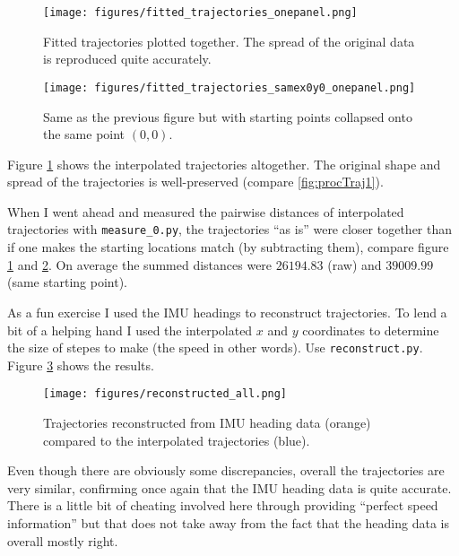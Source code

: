 \documentclass[a4]{article}
\begin{document}
\begin{figure}\begin{center}
  \texttt{[image: figures/fitted\_trajectories\_onepanel.png]}
  \caption{\label{fig:fittedTraj1} Fitted trajectories plotted
    together. The spread of the original data is reproduced quite
    accurately.
    }
\end{center}\end{figure}

\begin{figure}\begin{center}
  \texttt{[image: figures/fitted\_trajectories\_samex0y0\_onepanel.png]}
  \caption{\label{fig:fittedTraj2} Same as the previous figure but with
    starting points collapsed onto the same point $(0,0)$.
    }
\end{center}\end{figure}

Figure \ref{fig:fittedTraj1} shows the interpolated trajectories
altogether. The original shape and spread of the trajectories is
well-preserved (compare \ref{fig:procTraj1}).


When I went ahead and measured the pairwise distances of interpolated
trajectories with \verb+measure_0.py+, the trajectories ``as is'' were
closer together than if one makes the starting locations match (by
subtracting them), compare figure \ref{fig:fittedTraj1} and \ref{fig:fittedTraj2}. On average the summed distances were $26194.83$ (raw)
and $39009.99$ (same starting point).

As a fun exercise I used the IMU headings to reconstruct
trajectories. To lend a bit of a helping hand I used the interpolated
$x$ and $y$ coordinates to determine the size of stepes to make (the
speed in other words). Use \verb+reconstruct.py+. Figure \ref{fig:reconstruct} shows the results.

\begin{figure}\begin{center}
  \texttt{[image: figures/reconstructed\_all.png]}
  \caption{\label{fig:reconstruct} Trajectories reconstructed from IMU
    heading data (orange) compared to the interpolated trajectories
    (blue).}
\end{center}\end{figure}

Even though there are obviously some discrepancies, overall the
trajectories are very similar, confirming once again that the IMU
heading data is quite accurate. There is a little bit of cheating
involved here through providing ``perfect speed information'' but that
does not take away from the fact that the heading data is overall mostly right.
\end{document}
